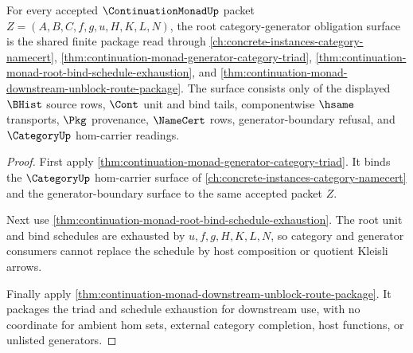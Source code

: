 \begin{theorem}
\label{thm:continuation-monad-root-category-generator-obligation-surface}
For every accepted $\ContinuationMonadUp$ packet $Z=(A,B,C,f,g,u,H,K,L,N)$, the root category-generator obligation surface is the shared finite package read through \autoref{ch:concrete-instances-category-namecert}, \autoref{thm:continuation-monad-generator-category-triad}, \autoref{thm:continuation-monad-root-bind-schedule-exhaustion}, and \autoref{thm:continuation-monad-downstream-unblock-route-package}. The surface consists only of the displayed $\BHist$ source rows, $\Cont$ unit and bind tails, componentwise $\hsame$ transports, $\Pkg$ provenance, $\NameCert$ rows, generator-boundary refusal, and $\CategoryUp$ hom-carrier readings.
\end{theorem}
\begin{proof}
First apply \autoref{thm:continuation-monad-generator-category-triad}. It binds the $\CategoryUp$ hom-carrier surface of \autoref{ch:concrete-instances-category-namecert} and the generator-boundary surface to the same accepted packet $Z$.

Next use \autoref{thm:continuation-monad-root-bind-schedule-exhaustion}. The root unit and bind schedules are exhausted by $u,f,g,H,K,L,N$, so category and generator consumers cannot replace the schedule by host composition or quotient Kleisli arrows.

Finally apply \autoref{thm:continuation-monad-downstream-unblock-route-package}. It packages the triad and schedule exhaustion for downstream use, with no coordinate for ambient hom sets, external category completion, host functions, or unlisted generators.
\end{proof}

